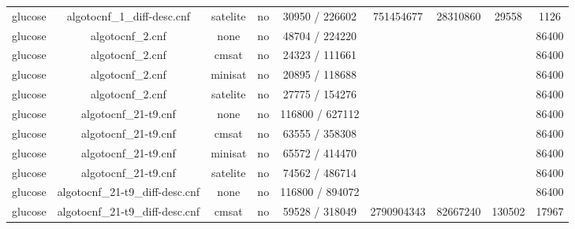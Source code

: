 \begin{appendices}
\begin{table}[p]
\begin{center}
\begin{tabular}{l|cccccccc}
  glucose                        & algotocnf\_1\_diff-desc.cnf    & satelite   & no    & 30950 / 226602 & 751454677 & 28310860  & 29558      & 1126 \\ %
  glucose                        & algotocnf\_2.cnf               & none       & no    & 48704 / 224220 &           &           &            & 86400 \\ %
  glucose                        & algotocnf\_2.cnf               & cmsat      & no    & 24323 / 111661 &           &           &            & 86400 \\ %
  glucose                        & algotocnf\_2.cnf               & minisat    & no    & 20895 / 118688 &           &           &            & 86400 \\ %
  glucose                        & algotocnf\_2.cnf               & satelite   & no    & 27775 / 154276 &           &           &            & 86400 \\ %
  glucose                        & algotocnf\_21-t9.cnf           & none       & no    & 116800 / 627112 &           &           &            & 86400 \\ %
  glucose                        & algotocnf\_21-t9.cnf           & cmsat      & no    & 63555 / 358308 &           &           &            & 86400 \\ %
  glucose                        & algotocnf\_21-t9.cnf           & minisat    & no    & 65572 / 414470 &           &           &            & 86400 \\ %
  glucose                        & algotocnf\_21-t9.cnf           & satelite   & no    & 74562 / 486714 &           &           &            & 86400 \\ %
  glucose                        & algotocnf\_21-t9\_diff-desc.cnf & none       & no    & 116800 / 894072 &           &           &            & 86400 \\ %
  glucose                        & algotocnf\_21-t9\_diff-desc.cnf & cmsat      & no    & 59528 / 318049 & 2790904343 & 82667240  & 130502     & 17967 \\ %

\end{tabular}
\end{center}
\end{table}
\end{appendices}
